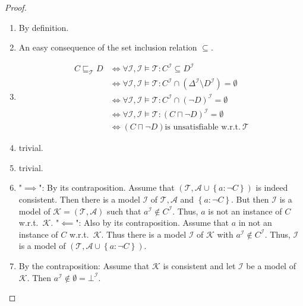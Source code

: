 \begin{proof}
	\begin{enumerate}
		\item By definition.
		\item An easy consequence of the set inclusion relation $\subseteq$.
		\item
			\begin{align*}
				C \sqsubseteq_{\mathcal{T}} D & \iff \forall \mathcal{I}, \mathcal{I} \vDash \mathcal{T}: C^{\mathcal{I}} \subseteq D^{\mathcal{I}}\\
											  & \iff \forall \mathcal{I}, \mathcal{I} \vDash \mathcal{T} : C^\mathcal{I} \cap (\Delta^{\mathcal{I}} \setminus D^{\mathcal{I}}) = \emptyset\\
											  & \iff \forall \mathcal{I}, \mathcal{I} \vDash \mathcal{T}: C^{\mathcal{I}} \cap (\neg D)^\mathcal{I} = \emptyset\\
											  & \iff \forall \mathcal{I}, \mathcal{I} \vDash \mathcal{T}: \left( C \sqcap \neg D \right)^\mathcal{I} = \emptyset\\
											  & \iff \left( C \sqcap \neg D \right) \text{is unsatisfiable w.r.t.}\ \mathcal{T} 
			\end{align*}
		\item trivial.
		\item trivial.
		\item "$ \implies$": By its contraposition. \newline
			Assume that $\left( \mathcal{T}, \mathcal{A} \cup \left\{a: \neg C \right\} \right)$ is indeed consistent.
			Then there is  a model $\mathcal{I}$ of $\mathcal{T} , \mathcal{A}$ and $\left\{ a: \neg C \right\}$.
			But then $\mathcal{I}$ is a model of $\mathcal{K} = \left( \mathcal{T}, \mathcal{A} \right)$ such that
			$a^{\mathcal{I}} \notin C^\mathcal{I}$.
			Thus, $a$ is not an instance of $C$ w.r.t.\ $\mathcal{K}$. \newline
			"$\impliedby$": Also by its contraposition. \newline
			Assume that $a$ in not an instance of $C$ w.r.t.\ $\mathcal{K}$.
			Thus there is a model $\mathcal{I}$ of $\mathcal{K}$ with $a^\mathcal{I} \notin C^\mathcal{I}$.
			Thus, $\mathcal{I}$ is a model of $\left( \mathcal{T}, \mathcal{A} \cup \left\{ a: \neg C \right\} \right)$.
		\item By the contraposition: \newline
			Assume that $\mathcal{K}$ is consistent and let $\mathcal{I}$ be a model of $\mathcal{K}$.
			Then $a^\mathcal{I} \notin \emptyset = \bot^\mathcal{I}$.

\end{enumerate}
\end{proof}
